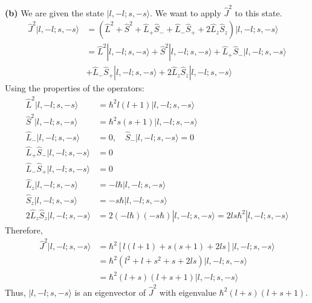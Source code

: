 \documentclass{article}
\begin{document}
\textbf{(b)} We are given the state \(|l, -l; s, -s\rangle\). We want to apply $\hat{J}^2$ to this state.
\[
\begin{aligned}
\hat{J}^2 |l, -l; s, -s\rangle &= (\hat{L}^2 + \hat{S}^2 + \hat{L}_+ \hat{S}_- + \hat{L}_- \hat{S}_+ + 2 \hat{L}_z \hat{S}_z) |l, -l; s, -s\rangle \\
&= \hat{L}^2 |l, -l; s, -s\rangle + \hat{S}^2 |l, -l; s, -s\rangle + \hat{L}_+ \hat{S}_- |l, -l; s, -s\rangle \\
&+ \hat{L}_- \hat{S}_+ |l, -l; s, -s\rangle + 2 \hat{L}_z \hat{S}_z |l, -l; s, -s\rangle
\end{aligned}
\]
Using the properties of the operators:
\[
\begin{aligned}
\hat{L}^2 |l, -l; s, -s\rangle &= \hbar^2 l(l+1) |l, -l; s, -s\rangle \\
\hat{S}^2 |l, -l; s, -s\rangle &= \hbar^2 s(s+1) |l, -l; s, -s\rangle \\
\hat{L}_- |l, -l; s, -s\rangle &= 0, \quad \hat{S}_- |l, -l; s, -s\rangle = 0 \\
\hat{L}_+ \hat{S}_- |l, -l; s, -s\rangle &= 0 \\
\hat{L}_- \hat{S}_+ |l, -l; s, -s\rangle &= 0 \\
\hat{L}_z |l, -l; s, -s\rangle &= -l \hbar |l, -l; s, -s\rangle \\
\hat{S}_z |l, -l; s, -s\rangle &= -s \hbar |l, -l; s, -s\rangle \\
2 \hat{L}_z \hat{S}_z |l, -l; s, -s\rangle &= 2 (-l \hbar) (-s \hbar) |l, -l; s, -s\rangle = 2ls \hbar^2 |l, -l; s, -s\rangle
\end{aligned}
\]
Therefore,
\[
\begin{aligned}
\hat{J}^2 |l, -l; s, -s\rangle &= \hbar^2 [l(l+1) + s(s+1) + 2ls] |l, -l; s, -s\rangle \\
&= \hbar^2 (l^2 + l + s^2 + s + 2ls) |l, -l; s, -s\rangle \\
&= \hbar^2 (l+s)(l+s+1) |l, -l; s, -s\rangle
\end{aligned}
\]
Thus, \(|l, -l; s, -s\rangle\) is an eigenvector of \(\hat{J}^2\) with eigenvalue \(\hbar^2 (l+s)(l+s+1)\).
\end{document}
